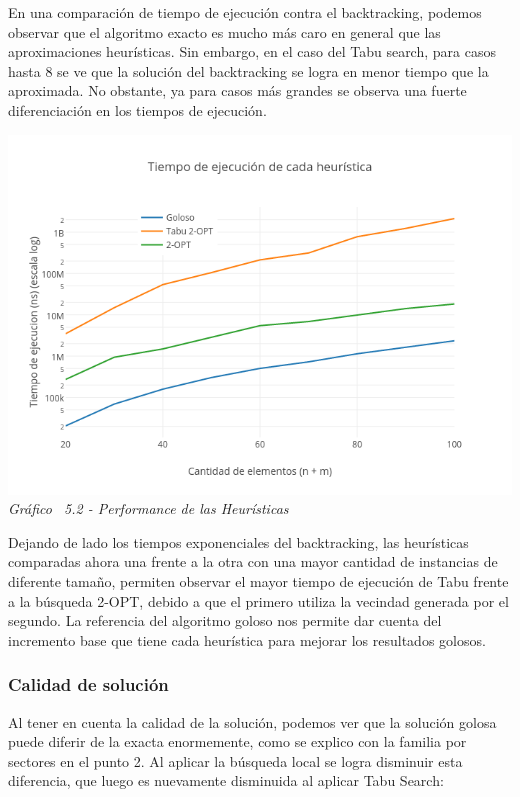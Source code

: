 En una comparación de tiempo de ejecución contra el backtracking, podemos observar que el algoritmo exacto es mucho más caro en general que las aproximaciones heurísticas. Sin embargo, en el caso del Tabu search, para casos hasta 8 se ve que la solución del backtracking se logra en menor tiempo que la aproximada. No obstante, ya para casos más grandes se observa una fuerte diferenciación en los tiempos de ejecución.

\vspace*{0.3cm} \vspace*{0.3cm}
  \begin{center}
 \includegraphics[scale=0.5]{./EJ5/medicion.png}\\
 {\textit{Gráfico \ 5.2 - Performance de las Heur\'isticas}}
  \end{center}
  \vspace*{0.3cm}


Dejando de lado los tiempos exponenciales del backtracking, las heurísticas comparadas ahora una frente a la otra con una mayor cantidad de instancias de diferente tamaño, permiten observar el mayor tiempo de ejecución de Tabu frente a la búsqueda 2-OPT, debido a que el primero utiliza la vecindad generada por el segundo. La referencia del algoritmo goloso nos permite dar cuenta del incremento base que tiene cada heurística para mejorar los resultados golosos.

\subsubsection*{Calidad de solución}

Al tener en cuenta la calidad de la solución, podemos ver que la solución golosa puede diferir de la exacta enormemente, como se explico con la familia por sectores en el punto 2. Al aplicar la búsqueda local se logra disminuir esta diferencia, que luego es nuevamente disminuida al aplicar Tabu Search:

